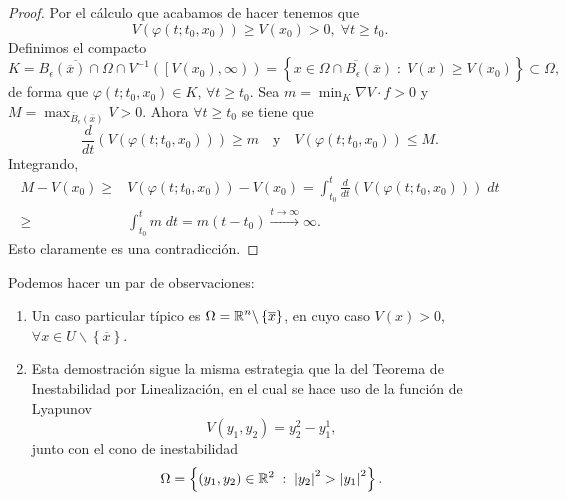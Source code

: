 \begin{proof}
\noindent Por el cálculo que acabamos de hacer tenemos que 
\[V\left(\varphi\left(t; t_{0}, x_{0}\right)\right)\geq V\left(x_{0}\right) > 0, \; \forall t \geq t_{0} .\]
Definimos el compacto
\[K = \overline{B_{\epsilon }\left(\overline{x}\right)\cap \Omega} \cap V^{-1}\left(\left[V\left(x_{0}\right), \infty\right)\right) = \left\{ x \in \overline{\Omega \cap B_{\epsilon }\left(\overline{x}\right)}\; : \; V\left(x\right)\geq V\left(x_{0}\right)\right\}  \subset \Omega  ,\]
de forma que $\displaystyle \varphi\left(t; t_{0}, x_{0}\right)\in K $, $\displaystyle \forall t \geq t_{0} $. Sea $\displaystyle m = \min_{K}\nabla V \cdot f > 0$ y $\displaystyle M = \max_{\overline{B}_{\epsilon }\left(\overline{x}\right)}V > 0 $. Ahora $\displaystyle \forall t \geq t_{0} $ se tiene que 
\[\frac{d}{dt}\left(V\left(\varphi\left(t; t_{0}, x_{0}\right)\right)\right)\geq m \quad \text{y} \quad V\left(\varphi\left(t; t_{0}, x_{0}\right)\right)\leq M .\]
Integrando,
\[
\begin{split}
	M - V\left(x_{0}\right)\geq & V\left(\varphi\left(t; t_{0}, x_{0}\right)\right)-V\left(x_{0}\right)=\int^{t}_{t_{0}} \frac{d}{dt}\left(V\left(\varphi\left(t; t_{0}, x_{0}\right)\right)\right) \; dt \\
	\geq & \int^{t}_{t_{0}} m \; dt = m\left(t-t_{0}\right) \xrightarrow{t \to \infty} \infty.
\end{split}
\]
Esto claramente es una contradicción. 
\end{proof}
\begin{observation} Podemos hacer un par de observaciones:
	\begin{enumerate}
		\item Un caso particular típico es $\displaystyle \Omega = \mathbb{R}^{n} \backslash \left\{ \overline{x}\right\}  $, en cuyo caso $\displaystyle V\left(x\right)> 0 $, $\displaystyle \forall x \in U\backslash \left\{ \overline{x}\right\}  $.
	\item Esta demostración sigue la misma estrategia que la del Teorema de Inestabilidad por Linealización, en el cual se hace uso de la función de Lyapunov 
		\[ V\left(y_{1}, y_{2}\right)=y_{2}^{2}-y_{1}^{1} ,\]
		junto con el cono de inestabilidad
		\[\Omega = \left\{ \left(y_{1}, y_{2}\right)\in \mathbb{R}^{2} \; : \; \left|y_{2}\right|^{2} > \left|y_{1}\right|^{2}\right\}  .\]
	\end{enumerate}
\end{observation}
